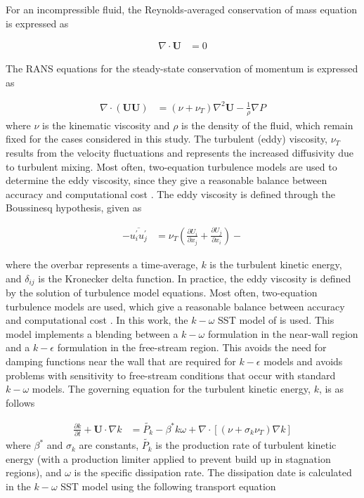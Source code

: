 For an incompressible fluid, the Reynolds-averaged conservation of mass equation is expressed as

\begin{align}
\nabla \cdot \mathbf{U} &= 0
\end{align}

The RANS equations for the steady-state conservation of momentum is expressed as 

\begin{align}
\nabla \cdot (\mathbf{UU}) &= \left(\nu + \nu_T\right) \nabla ^2 \mathbf{U} - \frac{1}{\rho} \nabla P 
\end{align}
% 
where $\nu$ is the kinematic viscosity and $\rho$ is the density of the fluid, which remain fixed for the cases considered in this study. The turbulent (eddy) viscosity, $\nu_T$ results from the velocity fluctuations and represents the increased diffusivity due to turbulent mixing. Most often, two-equation turbulence models are used to determine the eddy viscosity, since they give a reasonable balance between accuracy and computational cost \cite{Versteeg1995}.
\skippingparagraph
The eddy viscosity is defined through the Boussinesq hypothesis, given as 

\begin{align}
-\overline{u_i^\prime u_j^\prime}
&= \nu_T \left(\frac{\partial U_i}{\partial x_j} + \frac{\partial U_j}{\partial x_i} \right) - %
\end{align}

where the overbar represents a time-average, $k$ is the turbulent kinetic energy, and $\delta_{ij}$ is the Kronecker delta function. In practice, the eddy viscosity is defined by the solution of turbulence model equations. Most often, two-equation turbulence models are used, which give a reasonable balance between accuracy and computational cost \cite{Versteeg1995}. 
\skippingparagraph
In this work, the $k-\omega$ SST model of \cite{Menter1994} is used. This model implements a blending between a $k-\omega$ formulation in the near-wall region and a $k-\epsilon$ formulation in the free-stream region. This avoids the need for damping functions near the wall that are required for $k-\epsilon$ models and avoids problems with sensitivity to free-stream conditions that occur with standard $k-\omega$ models.
\skippingparagraph
The governing equation for the turbulent kinetic energy, $k$, is as follows \cite{Menter1994}

\begin{align}
\frac{\partial k}{\partial t} + \mathbf{U}  \cdot \nabla  k &= \tilde{P_k} - \beta^*k\omega + \nabla \cdot \left[(\nu + \sigma_k \nu_T)\nabla k \right]
\label{eq:k}
\end{align}
%
where $\beta^*$ and $\sigma_k$ are constants, $\tilde{P_k}$ is the production rate of turbulent kinetic energy (with a production limiter applied to prevent build up in stagnation regions), and $\omega$ is the specific dissipation rate. The dissipation date is calculated in the $k-\omega$ SST model using the following transport equation \cite{Menter1994}


